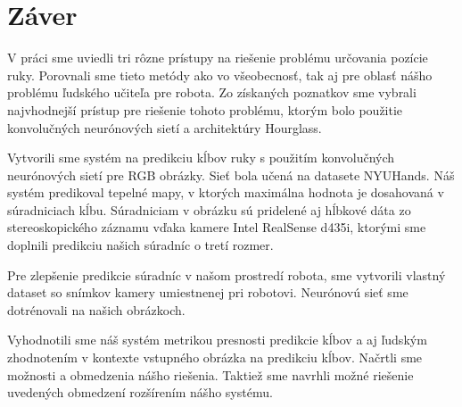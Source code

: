 \chapter*{Záver}\label{chap:conclusion}

V práci sme uviedli tri rôzne prístupy na riešenie problému určovania pozície ruky. Porovnali sme tieto metódy ako vo všeobecnosť, tak aj pre oblasť nášho problému ľudského učiteľa pre robota. Zo získaných poznatkov sme vybrali najvhodnejší prístup pre riešenie tohoto problému, ktorým bolo použitie konvolučných neurónových sietí a architektúry Hourglass.

Vytvorili sme systém na predikciu kĺbov ruky s použitím konvolučných neurónových sietí pre RGB obrázky. Sieť bola učená na datasete NYUHands. Náš systém predikoval tepelné mapy, v ktorých maximálna hodnota je dosahovaná v súradniciach kĺbu. Súradniciam v obrázku sú pridelené aj hĺbkové dáta zo stereoskopického záznamu vďaka kamere Intel RealSense d435i, ktorými sme doplnili predikciu našich súradníc o tretí rozmer.

Pre zlepšenie predikcie súradníc v našom prostredí robota, sme vytvorili vlastný dataset so snímkov kamery umiestnenej pri robotovi. Neurónovú sieť sme dotrénovali na našich obrázkoch.

Vyhodnotili sme náš systém metrikou presnosti predikcie kĺbov a aj ľudským zhodnotením v kontexte vstupného obrázka na predikciu kĺbov. Načrtli sme možnosti a obmedzenia nášho riešenia. Taktiež sme navrhli možné riešenie uvedených obmedzení rozšírením nášho systému.